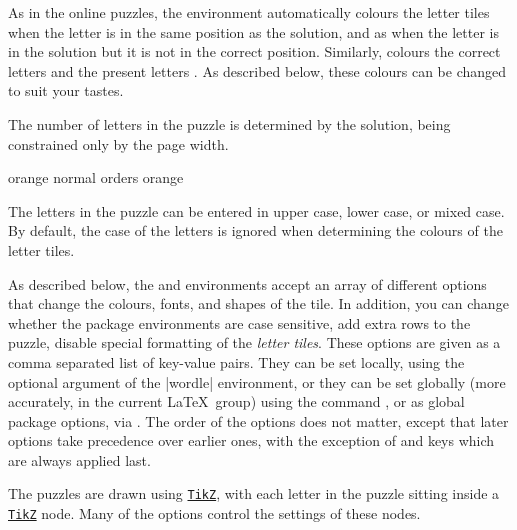 \documentclass[svgnames]{report}
\newcommand\ctan[1]{\href{https://www.ctan.org/pkg/#1}{\texttt{#1}}}
\begin{document}
  As in the online puzzles, the  environment
  automatically colours the letter tiles
  when the letter is in the same position as the solution, and as
   when
  the letter is in the solution but it is not in the correct position.
  Similarly,  colours the correct letters
  and the present letters
  .
  As described below, these colours can be changed to suit your tastes.

  The number of letters in the puzzle is determined by the solution,
  being constrained only by the page width.

  \begin{example}
  \begin{wordle}[rows=4]{orange}
     normal
     orders
     orange
  \end{wordle}
  \end{example}

  The letters in the puzzle can be entered in upper case, lower case, or
  mixed case. By default, the case of the letters is ignored when
  determining the colours of the letter tiles.

  As described below, the  and 
  environments accept an array of different options that change the
  colours, fonts, and shapes of the tile. In addition, you can change
  whether the package environments are case sensitive, add extra rows to the
  puzzle, disable special formatting of the \textit{letter tiles}.
  These options are given as a comma separated list of key-value pairs.
  They can be set locally, using the optional argument of the
  \keyword|wordle| environment, or they can be set globally (more
  accurately, in the current \LaTeX\ group) using the
  \keyword{\WordleSetup} command , or
  as global package options, via \keyword{\usepackage[options]{wordle}}.
  The order of the options does not matter, except that later options
  take precedence over earlier ones, with the exception of 
  and  keys which are always applied last.

  The  puzzles are drawn using \ctan{TikZ}, with each
  letter in the puzzle sitting inside a \ctan{TikZ} node. Many of the
  options control the settings of these nodes.
\end{document}

